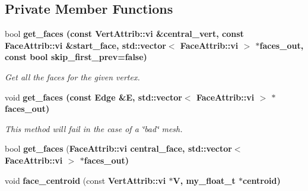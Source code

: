\subsection*{Private Member Functions}
\begin{CompactItemize}
\item 
bool \bf{get\_\-faces} (const \bf{Vert\-Attrib::vi} \&central\_\-vert, const \bf{Face\-Attrib::vi} \&start\_\-face, std::vector$<$ \bf{Face\-Attrib::vi} $>$ $\ast$faces\_\-out, const bool skip\_\-first\_\-prev=false)
\begin{CompactList}\small\item\em Get all the faces for the given vertex. \item\end{CompactList}\item 
void \bf{get\_\-faces} (const Edge \&E, std::vector$<$ \bf{Face\-Attrib::vi} $>$ $\ast$faces\_\-out)\label{classSimSite3D_1_1geometry_1_1SimpleTrimeshThree_b02e426e7faeba41f1b1814692130246}

\begin{CompactList}\small\item\em This method will fail in the case of a \char`\"{}bad\char`\"{} mesh. \item\end{CompactList}\item 
bool \textbf{get\_\-faces} (\bf{Face\-Attrib::vi} central\_\-face, std::vector$<$ \bf{Face\-Attrib::vi} $>$ $\ast$faces\_\-out)\label{classSimSite3D_1_1geometry_1_1SimpleTrimeshThree_365bd9e32896d3f3601714a2111cfbe9}

\item 
void \textbf{face\_\-centroid} (const \bf{Vert\-Attrib::vi} $\ast$V, my\_\-float\_\-t $\ast$centroid)\label{classSimSite3D_1_1geometry_1_1SimpleTrimeshThree_afdeeb98549efc087ee46a93a5bc4619}

\end{CompactItemize}
